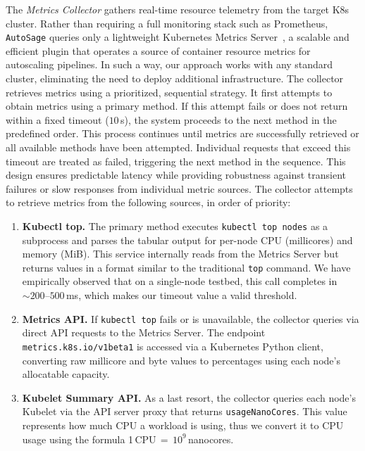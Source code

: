\documentclass[sigconf]{acmart}
\newcommand{\Solution}{\texttt{AutoSage}}
\newcommand{\pn}[1]{{\color{blue}{#1}}}
\begin{document}
The \emph{Metrics Collector} gathers real-time resource telemetry from the target K8s cluster.  Rather than requiring a full monitoring stack such as Prometheus, \Solution{} queries only a lightweight Kubernetes Metrics Server~\cite{k8s_metrics_server,k8s_resource_metrics_pipeline,k8s_kubectl_top}, a scalable and efficient plugin that operates a source of container resource metrics for autoscaling pipelines.
In such a way, our approach works with any standard cluster, eliminating the need to deploy additional infrastructure.  
The collector retrieves metrics using a prioritized, sequential strategy. It first attempts to obtain metrics using a primary method. If this attempt fails or does not return within a fixed timeout ($10$\,s), the system proceeds to the next method in the predefined order. This process continues until metrics are successfully retrieved or all available methods have been attempted. 
Individual requests that exceed this timeout are treated as failed, triggering the next method in the sequence. This design ensures predictable latency while providing robustness against transient failures or slow responses from individual metric sources.
%
The collector attempts to retrieve metrics from the following sources, in order of priority:
\begin{enumerate}
    \item \textbf{Kubectl top.}  The primary method executes \texttt{kubectl top nodes} as a subprocess and parses the tabular output for per-node CPU (millicores) and memory (MiB). This service internally reads from the Metrics Server but returns values in a format similar to the traditional \texttt{top} command. We have empirically observed that on a single-node testbed, this call completes in ${\sim}200$--$500$\,ms, which makes our timeout value a valid threshold.
    \item \textbf{Metrics API.}  If \texttt{kubectl top} fails or is unavailable, the collector queries via direct API requests to the Metrics Server. The endpoint \texttt{metrics.\allowbreak{}k8s.\allowbreak{}io/v1beta1} is accessed via a Kubernetes Python client, %
    converting raw millicore and byte values to percentages using each node's allocatable capacity. 
    \item \textbf{Kubelet Summary API.}  As a last resort, the collector queries each node's Kubelet via the API server proxy that returns \texttt{usageNanoCores}. This value represents how much CPU a workload is using, thus we convert it to CPU usage using the formula 1\,CPU\,$=$\,$10^{9}$\,nanocores.
\end{enumerate}
\end{document}
